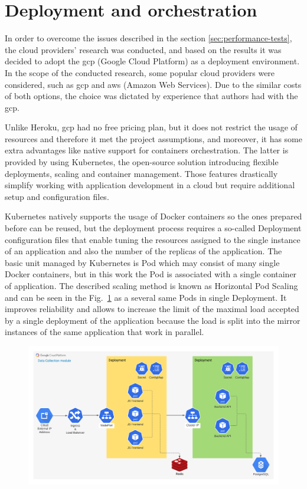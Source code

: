 \section{Deployment and orchestration}\label{sec:deployment-and-orchestration}
In order to overcome the issues described in the section \ref{sec:performance-tests}, the cloud providers' research was conducted, and based on the results it was decided to adopt the \gls{gcp} (Google Cloud Platform) as a deployment environment.
In the scope of the conducted research, some popular cloud providers were considered, such as \gls{gcp} and \gls{aws} (Amazon Web Services).
Due to the similar costs of both options, the choice was dictated by experience that authors had with the \gls{gcp}.

Unlike Heroku, \gls{gcp} had no free pricing plan, but it does not restrict the usage of resources and therefore it met the project assumptions, and moreover, it has some extra advantages like native support for containers orchestration.
The latter is provided by using Kubernetes, the open-source solution introducing flexible deployments, scaling and container management.
Those features drastically simplify working with application development in a cloud but require additional setup and configuration files.

Kubernetes natively supports the usage of Docker containers so the ones prepared before can be reused, but the deployment process requires a so-called Deployment configuration files that enable tuning the resources assigned to the single instance of an application and also the number of the replicas of the application.
The basic unit managed by Kubernetes is Pod which may consist of many single Docker containers, but in this work the Pod is associated with a single container of application.
The described scaling method is known as Horizontal Pod Scaling and can be seen in the Fig.~\ref{fig:gcp_diagram} as a several same Pods in single Deployment.
It improves reliability and allows to increase the limit of the maximal load accepted by a single deployment of the application because the load is split into the mirror instances of the same application that work in parallel.

\begin{figure}
    \includegraphics[width=\linewidth]{resources/gcp_diagram}
    \label{fig:gcp_diagram}
\end{figure}

